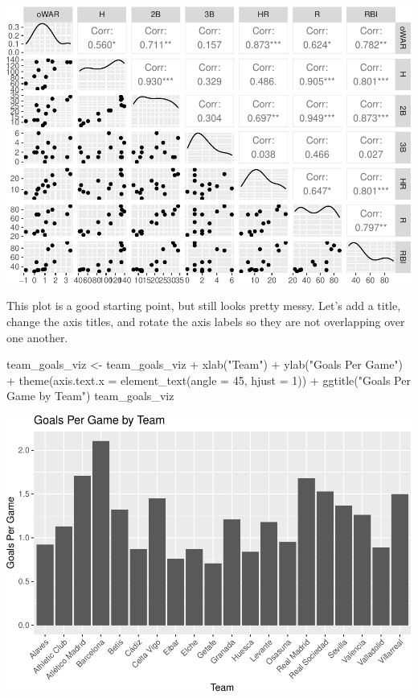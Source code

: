 \documentclass[
  11pt,
]{book}
\newenvironment{Shaded}{\begin{snugshade}}{\end{snugshade}}
\newcommand{\AttributeTok}[1]{\textcolor[rgb]{0.77,0.63,0.00}{#1}}
\newcommand{\DecValTok}[1]{\textcolor[rgb]{0.00,0.00,0.81}{#1}}
\newcommand{\FunctionTok}[1]{\textcolor[rgb]{0.00,0.00,0.00}{#1}}
\newcommand{\NormalTok}[1]{#1}
\newcommand{\OtherTok}[1]{\textcolor[rgb]{0.56,0.35,0.01}{#1}}
\newcommand{\SpecialCharTok}[1]{\textcolor[rgb]{0.00,0.00,0.00}{#1}}
\newcommand{\StringTok}[1]{\textcolor[rgb]{0.31,0.60,0.02}{#1}}
\theoremstyle{definition}
\theoremstyle{definition}
\theoremstyle{definition}
\theoremstyle{definition}
\theoremstyle{remark}
\begin{document}
\includegraphics{series_files/figure-latex/unnamed-chunk-12-1.pdf}

This plot is a good starting point, but still looks pretty messy. Let's add a title, change the axis titles, and rotate the axis labels so they are not overlapping over one another.

\begin{Shaded}
\begin{Highlighting}[]
\NormalTok{team\_goals\_viz }\OtherTok{\textless{}{-}}\NormalTok{ team\_goals\_viz }\SpecialCharTok{+} \FunctionTok{xlab}\NormalTok{(}\StringTok{"Team"}\NormalTok{) }\SpecialCharTok{+} \FunctionTok{ylab}\NormalTok{(}\StringTok{"Goals Per Game"}\NormalTok{) }\SpecialCharTok{+} \FunctionTok{theme}\NormalTok{(}\AttributeTok{axis.text.x =} \FunctionTok{element\_text}\NormalTok{(}\AttributeTok{angle =} \DecValTok{45}\NormalTok{,}
    \AttributeTok{hjust =} \DecValTok{1}\NormalTok{)) }\SpecialCharTok{+} \FunctionTok{ggtitle}\NormalTok{(}\StringTok{"Goals Per Game by Team"}\NormalTok{)}
\NormalTok{team\_goals\_viz}
\end{Highlighting}
\end{Shaded}

\includegraphics{series_files/figure-latex/unnamed-chunk-13-1.pdf}
\end{document}
